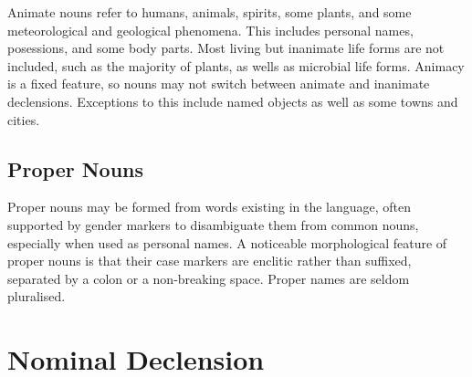 \documentclass[grammar]{subfiles}
\begin{document}
  Animate nouns refer to humans, animals, spirits, some plants, and some meteorological and geological phenomena. This includes personal names, posessions, and some body parts. Most living but inanimate life forms are not included, such as the majority of plants, as wells as microbial life forms. Animacy is a fixed feature, so nouns may not switch between animate and inanimate declensions. Exceptions to this include named objects as well as some towns and cities.

  \subsection{Proper Nouns}
  \label{ssec:nm_proper_nouns}

  Proper nouns may be formed from words existing in the language\footnotemark{}, often supported by gender markers to disambiguate them from common nouns, especially when used as personal names. A noticeable morphological feature of proper nouns is that their case markers are enclitic rather than suffixed, separated by a colon or a non-breaking space. Proper names are seldom pluralised.






  \section{Nominal Declension}
  \label{sec:nm_declension}
\end{document}
